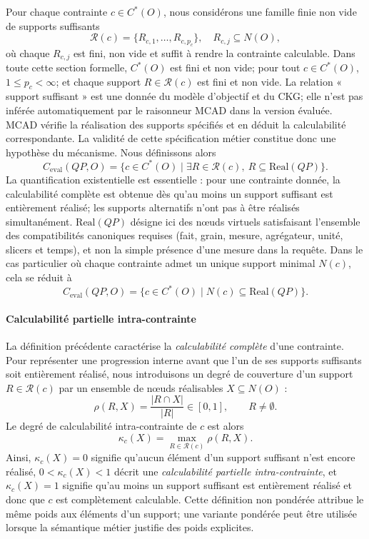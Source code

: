 \documentclass[journal]{IEEEtran}
\begin{document}
Pour chaque contrainte $c\in C^*(O)$, nous considérons une famille finie non vide de supports suffisants
\[
\mathcal{R}(c)=\{R_{c,1},\dots,R_{c,p_c}\},\quad R_{c,j}\subseteq N(O),
\]
où chaque $R_{c,j}$ est fini, non vide et suffit à rendre la contrainte calculable. Dans toute cette section formelle, $C^*(O)$ est fini et non vide; pour tout $c\in C^*(O)$, $1\le p_c<\infty$; et chaque support $R\in\mathcal R(c)$ est fini et non vide. La relation « support suffisant » est une donnée du modèle d'objectif et du CKG; elle n'est pas inférée automatiquement par le raisonneur MCAD dans la version évaluée. MCAD vérifie la réalisation des supports spécifiés et en déduit la calculabilité correspondante. La validité de cette spécification métier constitue donc une hypothèse du mécanisme. Nous définissons alors
\[
C_{\mathrm{eval}}(QP,O)=\{c\in C^*(O)\mid \exists R\in \mathcal{R}(c),\ R\subseteq \mathrm{Real}(QP)\}.
\]
La quantification existentielle est essentielle : pour une contrainte donnée, la calculabilité complète est obtenue dès qu'au moins un support suffisant est entièrement réalisé; les supports alternatifs n'ont pas à être réalisés simultanément. $\mathrm{Real}(QP)$ désigne ici des nœuds virtuels satisfaisant l'ensemble des compatibilités canoniques requises (fait, grain, mesure, agrégateur, unité, slicers et temps), et non la simple présence d'une mesure dans la requête.
Dans le cas particulier où chaque contrainte admet un unique support minimal $N(c)$, cela se réduit à
\[
C_{\mathrm{eval}}(QP,O)=\{c\in C^*(O)\mid N(c)\subseteq \mathrm{Real}(QP)\}.
\]

\paragraph*{Calculabilité partielle intra-contrainte}
La définition précédente caractérise la \emph{calculabilité complète} d'une contrainte. Pour représenter une progression interne avant que l'un de ses supports suffisants soit entièrement réalisé, nous introduisons un degré de couverture d'un support $R\in\mathcal{R}(c)$ par un ensemble de nœuds réalisables $X\subseteq N(O)$ :
\[
\rho(R,X)=\frac{|R\cap X|}{|R|}\in[0,1],\qquad R\neq\emptyset.
\]
Le degré de calculabilité intra-contrainte de $c$ est alors
\[
\kappa_c(X)=\max_{R\in\mathcal{R}(c)}\rho(R,X).
\]
Ainsi, $\kappa_c(X)=0$ signifie qu'aucun élément d'un support suffisant n'est encore réalisé, $0<\kappa_c(X)<1$ décrit une \emph{calculabilité partielle intra-contrainte}, et $\kappa_c(X)=1$ signifie qu'au moins un support suffisant est entièrement réalisé et donc que $c$ est complètement calculable. Cette définition non pondérée attribue le même poids aux éléments d'un support; une variante pondérée peut être utilisée lorsque la sémantique métier justifie des poids explicites.
\end{document}
